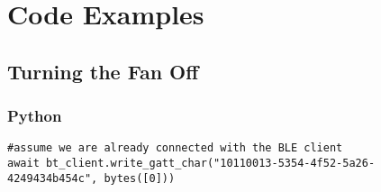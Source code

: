\chapter{Code Examples}
\section{Turning the Fan Off}
    \subsection{Python}
        \begin{lstlisting}[caption=Example of Python code]
#assume we are already connected with the BLE client
await bt_client.write_gatt_char("10110013-5354-4f52-5a26-4249434b454c", bytes([0]))
        \end{lstlisting}
    
